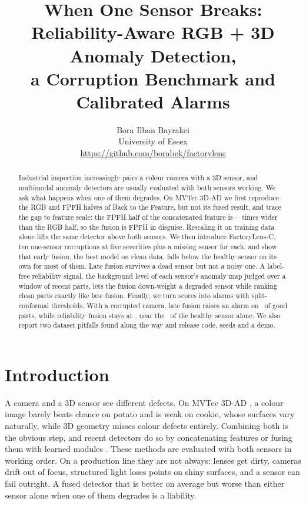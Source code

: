 \documentclass[10pt,twocolumn,letterpaper]{article}
\title{When One Sensor Breaks:\\Reliability-Aware RGB + 3D Anomaly Detection,\\a Corruption Benchmark and Calibrated Alarms}
\author{Bora Ilban Bayrakci\\University of Essex\\{\small\url{https://github.com/borabek/factorylens}}}
\date{}
\begin{document}
\maketitle

\begin{abstract}
Industrial inspection increasingly pairs a colour camera with a 3D sensor, and multimodal anomaly detectors are usually evaluated with both sensors working. We ask what happens when one of them degrades. On MVTec 3D-AD we first reproduce the RGB and FPFH halves of Back to the Feature, but not its fused result, and trace the gap to feature scale: the FPFH half of the concatenated feature is \spreadMin--\spreadMax\ times wider than the RGB half, so the fusion is FPFH in disguise. Rescaling it on training data alone lifts the same detector above both sensors. We then introduce FactoryLens-C, ten one-sensor corruptions at five severities plus a missing sensor for each, and show that early fusion, the best model on clean data, falls below the healthy sensor on its own for most of them. Late fusion survives a dead sensor but not a noisy one. A label-free reliability signal, the background level of each sensor's anomaly map judged over a window of recent parts, lets the fusion down-weight a degraded sensor while ranking clean parts exactly like late fusion. Finally, we turn scores into alarms with split-conformal thresholds. With a corrupted camera, late fusion raises an alarm on \lateRgbFalse\ of good parts, while reliability fusion stays at \reliableRgbFalse, near the \healthyRgbFalse\ of the healthy sensor alone. We also report two dataset pitfalls found along the way and release code, seeds and a demo.
\end{abstract}

\section{Introduction}

A camera and a 3D sensor see different defects. On MVTec 3D-AD \citep{bergmann2022mvtec3d}, a colour image barely beats chance on potato and is weak on cookie, whose surfaces vary naturally, while 3D geometry misses colour defects entirely. Combining both is the obvious step, and recent detectors do so by concatenating features \citep{horwitz2023btf} or fusing them with learned modules \citep{wang2023m3dm}. These methods are evaluated with both sensors in working order. On a production line they are not always: lenses get dirty, cameras drift out of focus, structured light loses points on shiny surfaces, and a sensor can fail outright. A fused detector that is better on average but worse than either sensor alone when one of them degrades is a liability.
\end{document}
